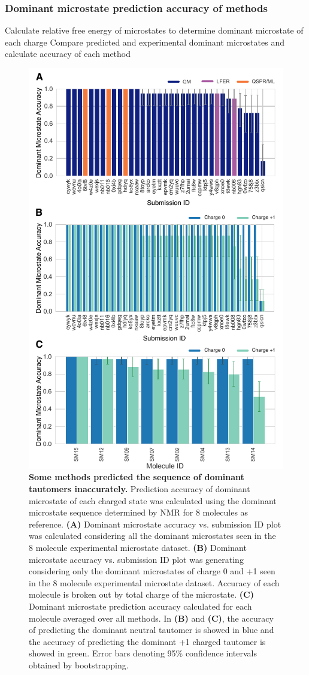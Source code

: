 \documentclass[9pt,lineno,final]{elife}
\begin{document}
\subsubsection{Dominant microstate prediction accuracy of methods}

Calculate relative free energy of microstates to determine dominant microstate of each charge
Compare predicted and experimental dominant microstates and calculate accuracy of each method





\begin{figure}
\centering
\includegraphics[width=0.5\linewidth]{figures/typeI_dominant_microstate_accuracy.pdf}
\caption{{\bf Some methods predicted the sequence of dominant tautomers inaccurately.} Prediction accuracy of dominant microstate of each charged state was calculated using the dominant microstate sequence determined by NMR for 8 molecules as reference. 
{\bf(A)} Dominant microstate accuracy vs. submission ID plot was calculated considering all the dominant microstates seen in the 8 molecule experimental microstate dataset. {\bf(B)} Dominant microstate accuracy vs. submission ID plot was generating considering only the dominant microstates of charge 0 and +1 seen in the 8 molecule experimental microstate dataset. Accuracy of each molecule is broken out by total charge of the microstate. {\bf(C)} Dominant microstate prediction accuracy calculated for each molecule averaged over all methods. In {\bf(B)} and {\bf(C)}, the accuracy of predicting the dominant neutral tautomer is showed in blue and the accuracy of predicting the dominant +1 charged tautomer is showed in green. Error bars denoting 95\% confidence intervals obtained by bootstrapping.
}
\label{fig:typeI_dominant_microstate_accuracy}
\end{figure}
\end{document}
